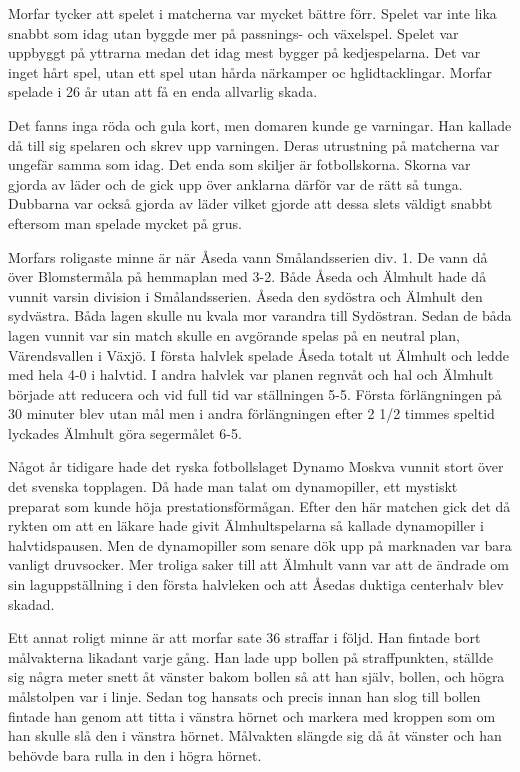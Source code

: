 Morfar tycker att spelet i matcherna var mycket bättre förr. Spelet var inte lika snabbt som idag utan byggde mer på passnings- och växelspel. Spelet var uppbyggt på yttrarna medan det idag mest bygger på kedjespelarna. Det var inget hårt spel, utan ett spel utan hårda närkamper oc hglidtacklingar. Morfar spelade i 26 år utan att få en enda allvarlig skada.

Det fanns inga röda och gula kort, men domaren kunde ge varningar. Han kallade då till sig spelaren och skrev upp varningen. Deras utrustning på matcherna var ungefär samma som idag. Det enda som skiljer är fotbollskorna. Skorna var gjorda av läder och de gick upp över anklarna därför var de rätt så tunga. Dubbarna var också gjorda av läder vilket gjorde att dessa slets väldigt snabbt eftersom man spelade mycket på grus.

Morfars roligaste minne är när Åseda vann Smålandsserien div. 1. De vann då över Blomstermåla på hemmaplan med 3-2. Både Åseda och Älmhult hade då vunnit varsin division i Smålandsserien. Åseda den sydöstra och Älmhult den sydvästra. Båda lagen skulle nu kvala mor varandra till Sydöstran. Sedan de båda lagen vunnit var sin match skulle en avgörande spelas på en neutral plan, Värendsvallen i Växjö. I första halvlek spelade Åseda totalt ut Älmhult och ledde med hela 4-0 i halvtid. I andra halvlek var planen regnvåt och hal och Älmhult började att reducera och vid full tid var ställningen 5-5. Första förlängningen på 30 minuter blev utan mål men i andra förlängningen efter 2 1/2 timmes speltid lyckades Älmhult göra segermålet 6-5.

Något år tidigare hade det ryska fotbollslaget Dynamo Moskva vunnit stort över det svenska topplagen. Då hade man talat om dynamopiller, ett mystiskt preparat som kunde höja prestationsförmågan. Efter den här matchen gick det då rykten om att en läkare hade givit Älmhultspelarna så kallade dynamopiller i halvtidspausen. Men de dynamopiller som senare dök upp på marknaden var bara vanligt druvsocker. Mer troliga saker till att Älmhult vann var att de ändrade om sin laguppställning i den första halvleken och att Åsedas duktiga centerhalv blev skadad.

Ett annat roligt minne är att morfar sate 36 straffar i följd. Han fintade bort målvakterna likadant varje gång. Han lade upp bollen på straffpunkten, ställde sig några meter snett åt vänster bakom bollen så att han själv, bollen, och högra målstolpen var i linje. Sedan tog hansats och precis innan han slog till bollen fintade han genom att titta i vänstra hörnet och markera med kroppen som om han skulle slå den i vänstra hörnet. Målvakten slängde sig då åt vänster och han behövde bara rulla in den i högra hörnet.

